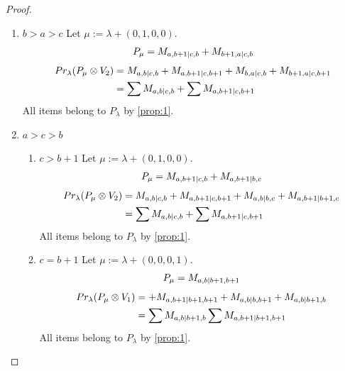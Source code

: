\begin{proof}
\begin{enumerate}
  \item $b>a>c$
        Let $\mu:=\lambda + (0,1,0,0) $. 
\begin{equation}\notag
  \begin{aligned}
      P_{\mu} = 
M_{a,b+1|c,b}
+M_{b+1,a|c,b}
  \end{aligned}
\end{equation}
\begin{equation}\notag
  \begin{aligned}
    Pr_{\lambda}(P_\mu \otimes V_2) &=
M_{a,b|c,b}
+M_{a,b+1|c,b+1}
+M_{b,a|c,b}
+M_{b+1,a|c,b+1} \\
                                    &=
\sum M_{a,b|c,b}
+\sum M_{a,b+1|c,b+1}
  \end{aligned}
\end{equation}
All items belong to $P_\lambda$ by \cref{prop:1}.

\item $a>c>b$
  \begin{enumerate}
    \item $c>b+1$
        Let $\mu:=\lambda + (0,1,0,0) $. 
\begin{equation}\notag
  \begin{aligned}
      P_{\mu} = 
M_{a,b+1|c,b}
+M_{a,b+1|b,c}
  \end{aligned}
\end{equation}
\begin{equation}\notag
  \begin{aligned}
    Pr_{\lambda}(P_\mu \otimes V_2) &=
M_{a,b|c,b}
+M_{a,b+1|c,b+1}
+M_{a,b|b,c}
+M_{a,b+1|b+1,c} \\
                                    &=
\sum M_{a,b|c,b}
+\sum M_{a,b+1|c,b+1}
  \end{aligned}
\end{equation}
All items belong to $P_\lambda$ by \cref{prop:1}.
    \item $c=b+1 $
        Let $\mu:=\lambda + (0,0,0,1) $. 
\begin{equation}\notag
  \begin{aligned}
      P_{\mu} = M_{a,b|b+1,b+1}
  \end{aligned}
\end{equation}
\begin{equation}\notag
  \begin{aligned}
    Pr_{\lambda}(P_\mu \otimes V_1) &=
+M_{a,b+1|b+1,b+1}
+M_{a,b|b,b+1}
+M_{a,b|b+1,b}\\
                                    &=
\sum M_{a,b|b+1,b}
\sum M_{a,b+1|b+1,b+1}
  \end{aligned}
\end{equation}
All items belong to $P_\lambda$ by \cref{prop:1}.
    

\end{enumerate}
\end{enumerate}
\end{proof}
